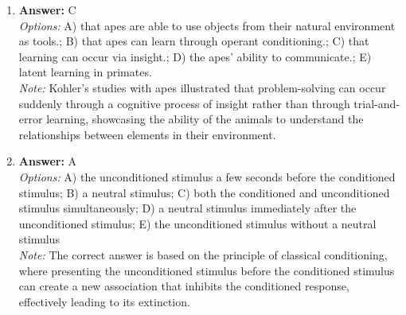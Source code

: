 \documentclass[12pt]{article}
\begin{document}
\begin{enumerate}[label=\arabic*.]
\item \textbf{Answer:} C
\\ \textit{Options:} A) that apes are able to use objects from their natural environment as tools.; B) that apes can learn through operant conditioning.; C) that learning can occur via insight.; D) the apes' ability to communicate.; E) latent learning in primates.
\\ \textit{Note:} Kohler's studies with apes illustrated that problem-solving can occur suddenly through a cognitive process of insight rather than through trial-and-error learning, showcasing the ability of the animals to understand the relationships between elements in their environment.
\item \textbf{Answer:} A
\\ \textit{Options:} A) the unconditioned stimulus a few seconds before the conditioned stimulus; B) a neutral stimulus; C) both the conditioned and unconditioned stimulus simultaneously; D) a neutral stimulus immediately after the unconditioned stimulus; E) the unconditioned stimulus without a neutral stimulus
\\ \textit{Note:} The correct answer is based on the principle of classical conditioning, where presenting the unconditioned stimulus before the conditioned stimulus can create a new association that inhibits the conditioned response, effectively leading to its extinction.
\end{enumerate}
\end{document}
